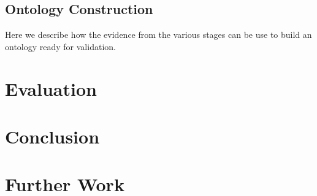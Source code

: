 \documentclass[a4paper]{report}
\begin{document}
\section{Ontology Construction}

Here we describe how the evidence from the various stages can be use to build an ontology ready for validation.


\chapter{Evaluation}

\chapter{Conclusion}

\chapter{Further Work}


\clearpage



\end{document}
